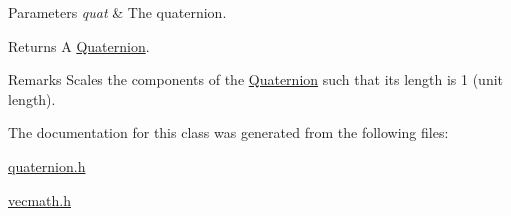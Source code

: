 \begin{DoxyParams}{Parameters}
{\em quat} & The quaternion.\\
\hline
\end{DoxyParams}
\begin{DoxyReturn}{Returns}
A \hyperlink{classgfxmath_1_1_quaternion}{Quaternion}.
\end{DoxyReturn}
\begin{DoxyRemark}{Remarks}
Scales the components of the \hyperlink{classgfxmath_1_1_quaternion}{Quaternion} such that its length is 1 (unit length). 
\end{DoxyRemark}


The documentation for this class was generated from the following files\+:\begin{DoxyCompactItemize}
\item 
\hyperlink{quaternion_8h}{quaternion.\+h}\item 
\hyperlink{vecmath_8h}{vecmath.\+h}\end{DoxyCompactItemize}
